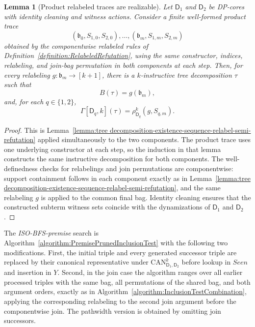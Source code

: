 \documentclass[11pt,a4paper]{article}
\newtheorem{lemma}[theorem]{Lemma}
\newcommand{\treewidthvalue}{k}
\newcommand{\abag}{\mathfrak{b}}
\newcommand{\topbagname}{B}
\newcommand{\topbag}[1]{\topbagname(#1)}
\newcommand{\abstractdecomposition}{\tau}
\newcommand{\dpcore}{\mathsf{D}}
\newcommand{\witnessset}{S}
\newcommand{\dynamizationfunctionname}[1]{\Gamma[{#1}]}
\newcommand{\dynamizationfunction}[2]{\dynamizationfunctionname{#1,#2}}
\newcommand{\action}{\rho}
\newcommand{\canonic}{\mathrm{CAN}}
\begin{document}
\begin{lemma}[Product relabeled traces are realizable]
\label{lemma:product-relabeled-traces-realizable}
Let $\dpcore_1$ and $\dpcore_2$ be DP-cores with identity cleaning and witness actions.
Consider a finite well-formed product trace
\[
(\abag_0,\witnessset_{1,0},\witnessset_{2,0}),\dots,
(\abag_m,\witnessset_{1,m},\witnessset_{2,m})
\]
obtained by the componentwise relabeled rules of Definition~\ref{definition:RelabeledRefutation}, using the same constructor, indices, relabeling, and join-bag permutation in both components at each step.
Then, for every relabeling $g:\abag_m\to[\treewidthvalue+1]$, there is a $\treewidthvalue$-instructive tree decomposition $\abstractdecomposition$ such that
\[
\topbag{\abstractdecomposition}=g(\abag_m),
\]
and, for each $q\in\{1,2\}$,
\[
\dynamizationfunction{\dpcore_q}{\treewidthvalue}(\abstractdecomposition)
=
\action_{\dpcore_q}^{\treewidthvalue}(g,\witnessset_{q,m}).
\]
\end{lemma}
\begin{proof}
This is Lemma~\ref{lemma:tree decomposition-existence-sequence-relabel-semi-refutation} applied simultaneously to the two components.
The product trace uses one underlying constructor at each step, so the induction in that lemma constructs the same instructive decomposition for both components.
The well-definedness checks for relabelings and join permutations are componentwise: support containment follows in each component exactly as in Lemma~\ref{lemma:tree decomposition-existence-sequence-relabel-semi-refutation}, and the same relabeling $g$ is applied to the common final bag.
Identity cleaning ensures that the constructed subterm witness sets coincide with the dynamizations of $\dpcore_1$ and $\dpcore_2$.
\end{proof}

The \emph{ISO-BFS-premise} search is Algorithm~\ref{algorithm:PremisePrunedInclusionTest} with the following two modifications. First, the initial triple and every generated successor triple are replaced by their canonical representative under $\canonic_{\dpcore_1,\dpcore_2}^{k}$ before lookup in $Seen$ and insertion in $Y$. Second, in the join case the algorithm ranges over all earlier processed triples with the same bag, all permutations of the shared bag, and both argument orders, exactly as in Algorithm~\ref{algorithm:InclusionTestCombination}, applying the corresponding relabeling to the second join argument before the componentwise join. The pathwidth version is obtained by omitting join successors.
\end{document}
